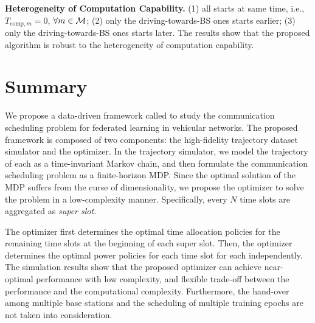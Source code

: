 \noindent\textbf{Heterogeneity of Computation Capability.}
(1) all starts at same time, i.e., $T_{\text{comp},m}=0$, $\forall m\in\mathcal{M}$;
(2) only the driving-towards-BS ones starts earlier;
(3) only the driving-towards-BS ones starts later.
The results show that the proposed algorithm is robust to the heterogeneity of computation capability.


\section{Summary}
\label{sec:chapter2-conclusion}
We propose a data-driven framework called {\fwName} to study the communication scheduling problem for federated learning in vehicular networks.
The proposed {\fwName} framework is composed of two components: the high-fidelity trajectory dataset simulator and the {\fwName} optimizer.
In the {\fwName} trajectory simulator, we model the trajectory of each {\IAV} as a time-invariant Markov chain, and then formulate the communication scheduling problem as a finite-horizon MDP.
Since the optimal solution of the MDP suffers from the curse of dimensionality, we propose the {\fwName} optimizer to solve the problem in a low-complexity manner.
Specifically, every $N$ time slots are aggregated as \emph{super slot}.

The {\fwName} optimizer first determines the optimal time allocation policies for the remaining time slots at the beginning of each super slot.
Then, the {\fwName} optimizer determines the optimal power policies for each time slot for each {\IAV} independently.
The simulation results show that the proposed {\fwName} optimizer can achieve near-optimal performance with low complexity, and flexible trade-off between the performance and the computational complexity.
Furthermore, the hand-over among multiple base stations and the scheduling of multiple training epochs are not taken into consideration.
